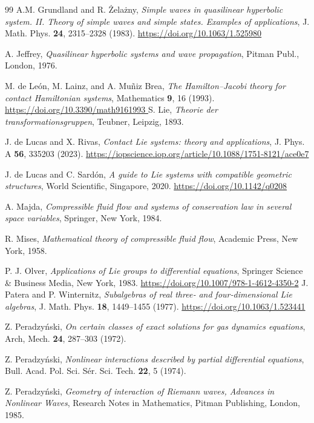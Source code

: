 \documentclass[12pt]{article}
\theoremstyle{plain}
\theoremstyle{definition}
\numberwithin{equation}{section}
\begin{document}
\begin{thebibliography}{99}
A.M. Grundland and R. \.Zela\.zny, {\sl Simple waves in quasilinear hyperbolic system. II. Theory of simple waves and simple states. Examples of applications}, J. Math. Phys. {\bf 24}, 2315--2328 (1983). \url{https://doi.org/10.1063/1.525980}

A. Jeffrey, {\sl Quasilinear hyperbolic systems and wave propagation}, Pitman Publ., London, 1976.
 
M. de Le\'on, M. Lainz, and A. Mu\~niz Brea, {\it The Hamilton–Jacobi theory for contact Hamiltonian systems}, Mathematics {\bf 9}, 16 (1993).  \url{https://doi.org/10.3390/math9161993
}
S. Lie, {\sl Theorie der transformationsgruppen}, Teubner, Leipzig, 1893.


J. de Lucas and X. Rivas,
{\it Contact Lie systems: theory and applications}, 
J. Phys. A {\bf 56}, 335203 (2023). \url{https://iopscience.iop.org/article/10.1088/1751-8121/ace0e7}

  J. de Lucas and C. Sard\'on, 
  {\sl A guide to Lie systems with compatible geometric structures}, World Scientific, Singapore, 2020. \url{https://doi.org/10.1142/q0208}

A. Majda, {\sl Compressible fluid flow and systems of conservation law in several space variables}, Springer, New York, 1984.



  R. Mises, {\sl Mathematical theory of compressible fluid flow}, Academic Press, New York, 1958.
  
  P. J. Olver, {\sl Applications of Lie groups to differential equations}, Springer Science \& Business Media,  New York, 1983. \url{https://doi.org/10.1007/978-1-4612-4350-2}
J. Patera and  P. Winternitz,
{\it Subalgebras of real three‐ and four‐dimensional Lie algebras},
J. Math. Phys. {\bf 18}, 1449--1455 (1977). \url{https://doi.org/10.1063/1.523441}

Z. Peradzy\'nski, {\it On certain classes of exact solutions for gas dynamics equations}, Arch, Mech. {\bf 24}, 287--303 (1972).

Z. Peradzy\'nski, {\it Nonlinear interactions described by partial differential equations}, Bull. Acad. Pol. Sci. S\'er. Sci. Tech. {\bf 22}, 5 (1974).


Z. Peradzy\'nski, {\sl Geometry of interaction of Riemann waves, Advances in Nonlinear Waves}, Research Notes in Mathematics, Pitman Publishing, London, 1985.


\end{thebibliography}
\end{document}
